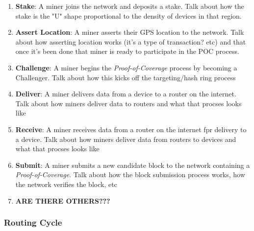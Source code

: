 \documentclass[letterpaper,11pt]{article}
\def\proofofcoverage/{\textit{Proof-of-Coverage}}
\begin{document}
\begin{enumerate}
  \item \textbf{Stake}: A miner joins the network and deposits a stake.\newline
  Talk about how the stake is the "U" shape proportional to the density of devices in that region.\newline
  
  \item \textbf{Assert Location}: A miner asserts their GPS location to the network.\newline
  Talk about how asserting location works (it's a type of transaction? etc) and that once it's been done that miner is ready to participate in the POC process.\newline
  
  \item \textbf{Challenge}: A miner begins the \proofofcoverage/ process by becoming a Challenger.\newline
  Talk about how this kicks off the targeting/hash ring process\newline
  
  \item \textbf{Deliver}: A miner delivers data from a device to a router on the internet.\newline
  Talk about how miners deliver data to routers and what that procses looks like\newline
  
  \item \textbf{Receive}: A miner receives data from a router on the internet fpr delivery to a device.\newline
  Talk about how miners deliver data from routers to devices and what that procses looks like\newline
  
  \item \textbf{Submit}: A miner submits a new candidate block to the network containing a \proofofcoverage/.\newline
  Talk about how the block submission process works, how the network verifies the block, etc\newline
  
  \item \textbf{ARE THERE OTHERS???}
  
\end{enumerate}

\subsubsection{Routing Cycle}
\end{document}
